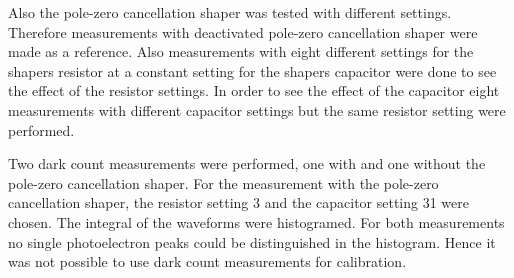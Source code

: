 Also the pole-zero cancellation shaper was tested with different settings.
Therefore measurements with deactivated pole-zero cancellation shaper were made as a reference.
Also measurements with eight different settings for the shapers resistor at a constant setting for the shapers capacitor were done to see the effect of the resistor settings.
In order to see the effect of the capacitor eight measurements with different capacitor settings but the same resistor setting were performed.



Two dark count measurements were performed, one with and one without the pole-zero cancellation shaper.
For the measurement with the pole-zero cancellation shaper, the resistor setting 3 and the capacitor setting 31 were chosen.
The integral of the waveforms were histogramed.
For both measurements no single photoelectron peaks could be distinguished in the histogram. 
Hence it was not possible to use dark count measurements for calibration.


